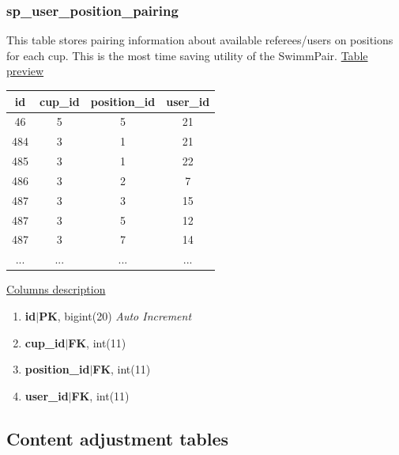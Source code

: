 \subsubsection*{sp\_user\_position\_pairing}
This table stores pairing information about available referees/users on positions for each cup. This is the most time saving utility of the SwimmPair.
\newline
\underline{Table preview}
\begin{center}
 \begin{tabular}{||c c c c||} 
 \hline
 id & cup\_id & position\_id & user\_id  \\ [0.5ex] 
 \hline\hline
 46 & 5 & 5 & 21 \\ 
 \hline
 484 & 3 & 1 & 21 \\ 
 \hline
 485 & 3 & 1 & 22 \\ 
 \hline
 486 & 3 & 2 & 7 \\
 \hline
 487 & 3 & 3 & 15 \\
 \hline
 487 & 3 & 5 & 12 \\
 \hline
 487 & 3 & 7 & 14 \\
 \hline
 ... & ... & ... & ... \\ [0.5ex] 
 \hline
\end{tabular}
\end{center}
\underline{Columns description}
\begin{enumerate}
  \setlength\itemsep{0em}
  \item \textbf{id$|$PK}, bigint(20) \textit{Auto Increment}
  \item \textbf{cup\_id$|$FK}, int(11)
  \item \textbf{position\_id$|$FK}, int(11)
  \item \textbf{user\_id$|$FK}, int(11)
\end{enumerate}
\subsection{Content adjustment tables}
